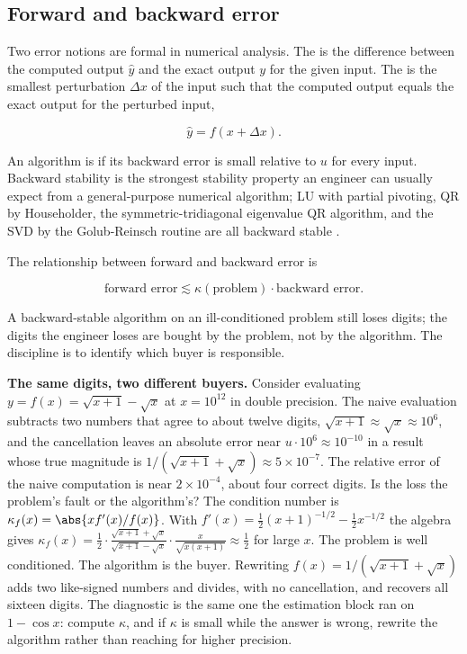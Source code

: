 \subsection{Forward and backward error}

Two error notions are formal in numerical analysis. The
 is the difference between the computed
output $\hat{y}$ and the exact output $y$ for the given input.
The  is the smallest perturbation
$\Delta x$ of the input such that the computed output equals the
exact output for the perturbed input,

\[
\hat{y} = f(x + \Delta x).
\]

An algorithm is  if its backward error
is small relative to $u$ for every input. Backward stability is
the strongest stability property an engineer can usually expect
from a general-purpose numerical algorithm; LU with partial
pivoting, QR by Householder, the symmetric-tridiagonal eigenvalue
QR algorithm, and the SVD by the Golub-Reinsch routine are all
backward stable
\cite[ch.~7]{text:trefethen-bau1997}.

The relationship between forward and backward error is

\[
\text{forward error} \lesssim \kappa(\text{problem}) \cdot
\text{backward error}.
\]

A backward-stable algorithm on an ill-conditioned problem still
loses digits; the digits the engineer loses are bought by the
problem, not by the algorithm. The discipline is to identify
which buyer is responsible.

\begin{example}
\textbf{The same digits, two different buyers.} Consider evaluating
$y = f(x) = \sqrt{x + 1} - \sqrt{x}$ at $x = 10^{12}$ in double
precision. The naive evaluation subtracts two numbers that agree to
about twelve digits, $\sqrt{x + 1} \approx \sqrt{x} \approx 10^{6}$,
and the cancellation leaves an absolute error near $u \cdot 10^{6}
\approx 10^{-10}$ in a result whose true magnitude is $1/(\sqrt{x+1}
+ \sqrt{x}) \approx 5 \times 10^{-7}$. The relative error of the
naive computation is near $2 \times 10^{-4}$, about four correct
digits. Is the loss the problem's fault or the algorithm's? The
condition number is $\kappa_{f}(x) = \abs{x f'(x)/f(x)}$. With
$f'(x) = \tfrac{1}{2}(x+1)^{-1/2} - \tfrac{1}{2}x^{-1/2}$ the
algebra gives $\kappa_{f}(x) = \tfrac{1}{2} \cdot
\frac{\sqrt{x+1} + \sqrt{x}}{\sqrt{x+1} - \sqrt{x}} \cdot
\frac{x}{\sqrt{x(x+1)}} \approx \tfrac{1}{2}$ for large $x$. The
problem is well conditioned. The algorithm is the buyer. Rewriting
$f(x) = 1/(\sqrt{x + 1} + \sqrt{x})$ adds two like-signed numbers
and divides, with no cancellation, and recovers all sixteen digits.
The diagnostic is the same one the estimation block ran on $1 -
\cos x$: compute $\kappa$, and if $\kappa$ is small while the answer
is wrong, rewrite the algorithm rather than reaching for higher
precision.
\end{example}

